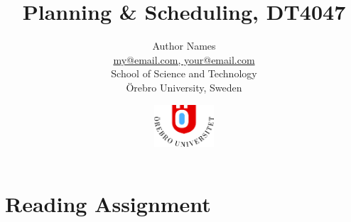 \documentclass[compress]{beamer}
\title{Planning \& Scheduling, DT4047}
\subtitle{\lectureTitle{}}
\author[F.~Pecora]{Author Names\\\url{my@email.com, your@email.com}\\\vspace{0.2cm}School of Science and Technology\\\vspace{0.1cm}\"Orebro University, Sweden}
\date{\centering
\vspace{1cm}
\includegraphics[height=45pt]{themeFig/Logo_txt_runt_farg-big.png}
}
\begin{document}
\maketitle


\section{Reading Assignment}



\end{document}

